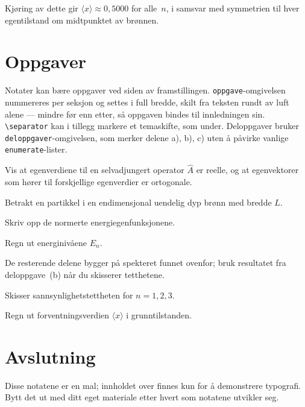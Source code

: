 \documentclass[a4paper,11pt]{article}
\begin{document}
Kjøring av dette gir $\langle x \rangle \approx 0{,}5000$ for alle~$n$, i samsvar med symmetrien til hver egentilstand om midtpunktet av brønnen.


\section{Oppgaver}

Notater kan bære oppgaver ved siden av framstillingen.
\verb|oppgave|-omgivelsen nummereres per seksjon og settes i
full bredde, skilt fra teksten rundt av luft alene — mindre før enn etter, så oppgaven bindes til innledningen sin.
\verb|\separator| kan i tillegg markere et temaskifte, som
under. Deloppgaver bruker \verb|deloppgaver|-omgivelsen, som merker delene a), b), c) uten å påvirke vanlige
\verb|enumerate|-lister.

\separator

\begin{oppgave}
  Vis at egenverdiene til en selvadjungert operator $\hat{A}$ er reelle, og at egenvektorer som hører til forskjellige egenverdier er ortogonale.
\end{oppgave}

\begin{oppgave}
  Betrakt en partikkel i en endimensjonal uendelig dyp brønn med bredde $L$.
  \begin{deloppgaver}
    \item Skriv opp de normerte energiegenfunksjonene.
    \item Regn ut energinivåene $E_n$.
  \end{deloppgaver}

  De resterende delene bygger på spekteret funnet ovenfor; bruk resultatet fra deloppgave~(b) når du skisserer tetthetene.

  \begin{deloppgaver}[resume]
    \item Skisser sannsynlighetstettheten for $n = 1, 2, 3$.
    \item Regn ut forventningsverdien $\langle x \rangle$ i grunntilstanden.
  \end{deloppgaver}
\end{oppgave}


\section{Avslutning}

Disse notatene er en mal; innholdet over finnes kun for å demonstrere typografi. Bytt det ut med ditt eget materiale etter hvert som notatene utvikler seg.




\end{document}
